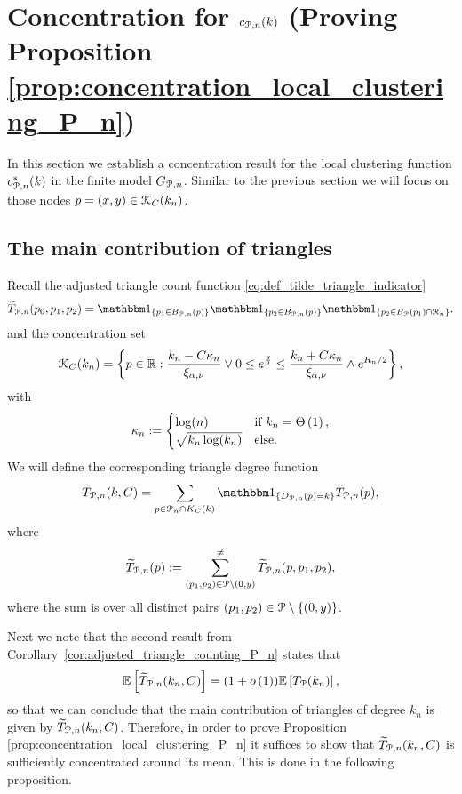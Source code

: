 \section{Concentration for $c_{{\mathcal P}, n}(k)$ (Proving Proposition \ref{prop:concentration_local_clustering_P_n})}
\label{sec:concentration_c_P_n}

In this section we establish a concentration result for the local clustering function $c_{{\mathcal P}, n}^\ast(k)$ in the finite model $G_{{\mathcal P},n}$. Similar to the previous section we will focus on those nodes $p = (x,y) \in {\mathcal K}_{C}(k_n)$.

\subsection{The main contribution of triangles}

Recall the adjusted triangle count function \eqref{eq:def_tilde_triangle_indicator}
\[
	\widetilde{T}_{\Pcal,n}(p_0,p_1,p_2) = \ind{p_1 \in B_{\Pcal,n}(p)}\ind{p_2 \in B_{\Pcal,n}(p)}\ind{p_2 \in B_{\Pcal}(p_1) \cap \Rcal_n}.
\]
and the concentration set
\[
	{\mathcal K}_C(k_n) = \left\{p \in {\ensuremath{\mathbb R}} : \frac{k_n - C \kappa_n}{\xi_{\alpha,\nu}} \vee 0 \le e^{\frac{y}{2}}
		\le \frac{k_n + C \kappa_n}{\xi_{\alpha,\nu}} \wedge e^{R_n/2} \right\},
\]
with
\[
	\kappa_n := \begin{cases}
		\log(n) &\mbox{if } k_n = \Theta\left(1\right),\\
		\sqrt{k_n \log(k_n)} &\mbox{else.}
	\end{cases}
\]
We will define the corresponding triangle degree function
\begin{equation}\label{eq:def_degree_triangle_count_in_K}
	\widetilde{T}_{\Pcal,n}(k, C) = \sum_{p \in \Pcal_n \cap K_C(k)} \ind{D_{\Pcal,n}(p) = k} \widetilde{T}_{\Pcal,n}(p),
\end{equation}
where
\[
	\widetilde{T}_{{\mathcal P},n}(p) := \sum_{(p_1, p_2) \in {\mathcal P}\setminus (0,y)}^{\ne} \widetilde{T}_{{\mathcal P},n}(p,p_1,p_2),
\]
where the sum is over all distinct pairs $(p_1, p_2) \in {\mathcal P} \setminus \{(0,y)\}$.

Next we note that the second result from Corollary~\ref{cor:adjusted_triangle_counting_P_n} states that
\begin{equation}\label{eq:asymptotic_equivalence_contraint_triangle_count}
	\mathbb{E}\left[\widetilde{T}_{{\mathcal P},n}(k_n,C)\right] = (1+o\left(1\right))\mathbb{E}\left[T_{{\mathcal P}}(k_n)\right],
\end{equation}
so that we can conclude that the main contribution of triangles of degree $k_n$ is given by $\widetilde{T}_{{\mathcal P},n}(k_n, C)$. Therefore, in order to prove Proposition \ref{prop:concentration_local_clustering_P_n} it suffices to show that $\widetilde{T}_{{\mathcal P},n}(k_n,C)$ is sufficiently concentrated around its mean. This is done in the following proposition.

